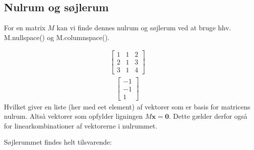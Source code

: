 \documentclass[letterpaper,10pt,english]{jupyterBook}
\begin{document}
\subsection{Nulrum og søjlerum}
\label{\detokenize{notebooks/sympy/Notebook_LinAlg_2:nulrum-og-sojlerum}}
For en matrix \(M\) kan vi finde dennes nulrum og søjlerum ved at bruge hhv. M.nullspace() og M.columnspace().

\begin{sphinxVerbatim}[commandchars=\\\{\}]
  \PYG{p}{[}\PYG{p}{[}  \PYG{p}{]} \PYG{p}{[}  \PYG{p}{]} \PYG{p}{[}  \PYG{p}{]}\PYG{p}{]}
\end{sphinxVerbatim}
\begin{equation*}
\begin{split}\displaystyle \left[\begin{matrix}1 & 1 & 2\\2 & 1 & 3\\3 & 1 & 4\end{matrix}\right]\end{split}
\end{equation*}\begin{equation*}
\begin{split}\displaystyle \left[\begin{matrix}-1\\-1\\1\end{matrix}\right]\end{split}
\end{equation*}
Hvilket giver en liste (her med eet element) af vektorer som er basis for matricens nulrum. Altså vektorer som opfylder ligningen \(M\boldsymbol{x} = \boldsymbol{0}\). Dette gælder derfor også for linearkombinationer af vektorerne i nulrummet.

Søjlerummet findes helt tilsvarende:
\end{document}
